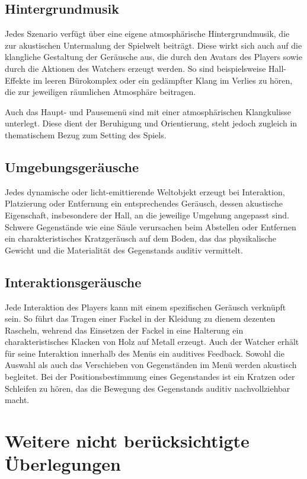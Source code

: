 \subsection{Hintergrundmusik}

Jedes Szenario verfügt über eine eigene atmosphärische Hintergrundmusik, die zur akustischen Untermalung der Spielwelt beiträgt. Diese wirkt sich auch auf die klangliche Gestaltung der Geräusche aus, die durch den Avatars des Players sowie durch die Aktionen des Watchers erzeugt werden. So sind beispielsweise Hall-Effekte im leeren Bürokomplex oder ein gedämpfter Klang im Verlies zu hören, die zur jeweiligen räumlichen Atmosphäre beitragen.

Auch das Haupt- und Pausemenü sind mit einer atmosphärischen Klangkulisse unterlegt. Diese dient der Beruhigung und Orientierung, steht jedoch zugleich in thematischem Bezug zum Setting des Spiels.

\subsection{Umgebungsgeräusche}

Jedes dynamische oder licht-emittierende Weltobjekt erzeugt bei Interaktion, Platzierung oder Entfernung ein entsprechendes Geräusch, dessen akustische Eigenschaft, insbesondere der Hall, an die jeweilige Umgehung angepasst sind. Schwere Gegenstände wie eine Säule verursachen beim Abstellen oder Entfernen ein charakteristisches Kratzgeräusch auf dem Boden, das das physikalische Gewicht und die Materialität des Gegenstands auditiv vermittelt.


\subsection{Interaktionsgeräusche}

Jede Interaktion des Players kann mit einem spezifischen Geräusch verknüpft sein. So führt das Tragen einer Fackel in der Kleidung zu dienem dezenten Rascheln, wehrend das Einsetzen der Fackel in eine Halterung ein charakteristisches Klacken von Holz auf Metall erzeugt. Auch der Watcher erhält für seine Interaktion innerhalb des Menüs ein auditives Feedback. Sowohl die Auswahl als auch das Verschieben von Gegenständen im Menü werden akustisch begleitet. Bei der Positionsbestimmung eines Gegenstandes ist ein Kratzen oder Schleifen zu hören, das die Bewegung des Gegenstands auditiv nachvollziehbar macht.


\section{Weitere nicht berücksichtigte Überlegungen}

